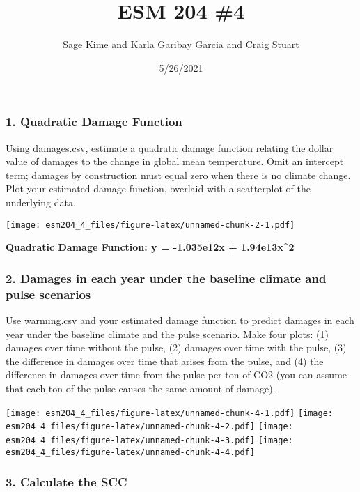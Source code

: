 \documentclass[
]{article}
\title{ESM 204 \#4}
\author{Sage Kime and Karla Garibay Garcia and Craig Stuart}
\date{5/26/2021}
\begin{document}
\maketitle

\hypertarget{quadratic-damage-function}{%
\subsubsection{1. Quadratic Damage
Function}\label{quadratic-damage-function}}

Using damages.csv, estimate a quadratic damage function relating the
dollar value of damages to the change in global mean temperature. Omit
an intercept term; damages by construction must equal zero when there is
no climate change. Plot your estimated damage function, overlaid with a
scatterplot of the underlying data.

\texttt{[image: esm204\_4\_files/figure-latex/unnamed-chunk-2-1.pdf]}

\textbf{Quadratic Damage Function: y = -1.035e12x + 1.94e13x\^{}2}

\hypertarget{damages-in-each-year-under-the-baseline-climate-and-pulse-scenarios}{%
\subsubsection{2. Damages in each year under the baseline climate and
pulse
scenarios}\label{damages-in-each-year-under-the-baseline-climate-and-pulse-scenarios}}

Use warming.csv and your estimated damage function to predict damages in
each year under the baseline climate and the pulse scenario. Make four
plots: (1) damages over time without the pulse, (2) damages over time
with the pulse, (3) the difference in damages over time that arises from
the pulse, and (4) the difference in damages over time from the pulse
per ton of CO2 (you can assume that each ton of the pulse causes the
same amount of damage).

\texttt{[image: esm204\_4\_files/figure-latex/unnamed-chunk-4-1.pdf]}
\texttt{[image: esm204\_4\_files/figure-latex/unnamed-chunk-4-2.pdf]}
\texttt{[image: esm204\_4\_files/figure-latex/unnamed-chunk-4-3.pdf]}
\texttt{[image: esm204\_4\_files/figure-latex/unnamed-chunk-4-4.pdf]}

\hypertarget{calculate-the-scc}{%
\subsubsection{3. Calculate the SCC}\label{calculate-the-scc}}
\end{document}
